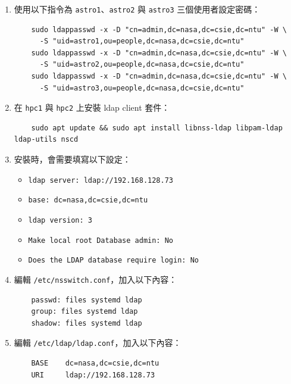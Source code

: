 \documentclass[12pt]{article}
\begin{document}
\begin{enumerate}
\begin{verbatim}
    dn: uid=astro3,ou=people,dc=nasa,dc=csie,dc=ntu
    objectClass: inetOrgPerson
    objectClass: posixAccount
    objectClass: shadowAccount
    cn: astro3
    sn: astro3
    uid: astro3
    uidNumber: 1003
    gidNumber: 1003
    homeDirectory: /mnt/nfs-share/astro3_dir
    loginShell: /bin/bash
  \end{verbatim}
  並用 \texttt{sudo ldapadd -x -D cn=admin,dc=nasa,dc=csie,dc=ntu -W -f user.ldif} 套用設定。
  \item 使用以下指令為 \texttt{astro1}、\texttt{astro2} 與 \texttt{astro3} 三個使用者設定密碼：
  \begin{verbatim}
    sudo ldappasswd -x -D "cn=admin,dc=nasa,dc=csie,dc=ntu" -W \
      -S "uid=astro1,ou=people,dc=nasa,dc=csie,dc=ntu"
    sudo ldappasswd -x -D "cn=admin,dc=nasa,dc=csie,dc=ntu" -W \
      -S "uid=astro2,ou=people,dc=nasa,dc=csie,dc=ntu"
    sudo ldappasswd -x -D "cn=admin,dc=nasa,dc=csie,dc=ntu" -W \
      -S "uid=astro3,ou=people,dc=nasa,dc=csie,dc=ntu"
  \end{verbatim}
  \item 在 \texttt{hpc1} 與 \texttt{hpc2} 上安裝 ldap client 套件：
  \begin{verbatim}
    sudo apt update && sudo apt install libnss-ldap libpam-ldap ldap-utils nscd
  \end{verbatim}
  \item 安裝時，會需要填寫以下設定：
  \begin{itemize}
    \item \texttt{ldap server: ldap://192.168.128.73}
    \item \texttt{base: dc=nasa,dc=csie,dc=ntu}
    \item \texttt{ldap version: 3}
    \item \texttt{Make local root Database admin: No}
    \item \texttt{Does the LDAP database require login: No}
  \end{itemize}
  \item 編輯 \texttt{/etc/nsswitch.conf}，加入以下內容：
  \begin{verbatim}
    passwd: files systemd ldap
    group: files systemd ldap
    shadow: files systemd ldap
  \end{verbatim}
  \item 編輯 \texttt{/etc/ldap/ldap.conf}，加入以下內容：
  \begin{verbatim}
    BASE    dc=nasa,dc=csie,dc=ntu
    URI     ldap://192.168.128.73
  \end{verbatim}

\end{enumerate}
\end{document}

